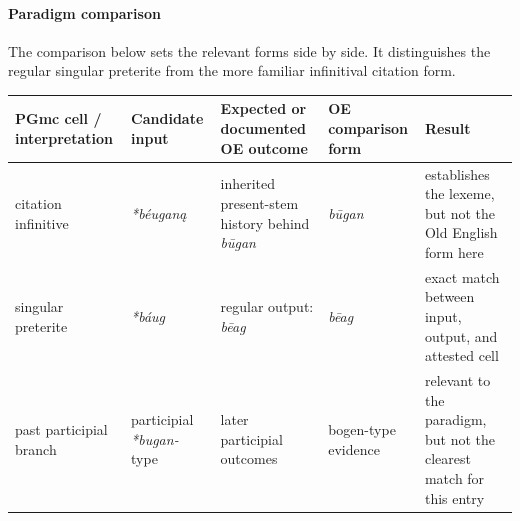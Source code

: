 \documentclass[
  british,
  a4paper,
]{article}
\newcounter{none} %
\begin{document}
\paragraph{Paradigm comparison}\label{paradigm-comparison-2}

The comparison below sets the relevant forms side by side. It
distinguishes the regular singular preterite from the more familiar
infinitival citation form.

{\def\LTcaptype{none} %
\begin{longtable}[]{@{}
  >{\raggedright\arraybackslash}p{}
  >{\raggedright\arraybackslash}p{}
  >{\raggedright\arraybackslash}p{}
  >{\raggedright\arraybackslash}p{}
  >{\raggedright\arraybackslash}p{}@{}}
\toprule\noalign{}
\begin{minipage}[b]{\linewidth}\raggedright
PGmc cell / interpretation
\end{minipage} & \begin{minipage}[b]{\linewidth}\raggedright
Candidate input
\end{minipage} & \begin{minipage}[b]{\linewidth}\raggedright
Expected or documented OE outcome
\end{minipage} & \begin{minipage}[b]{\linewidth}\raggedright
OE comparison form
\end{minipage} & \begin{minipage}[b]{\linewidth}\raggedright
Result
\end{minipage} \\
\midrule\noalign{}
\endhead
\bottomrule\noalign{}
\endlastfoot
citation infinitive & {\emph{*béuganą}} & inherited present-stem history
behind {\emph{būgan}} & {\emph{būgan}} & establishes the lexeme, but not
the Old English form here \\
singular preterite & {\emph{*báug}} & regular output: {\emph{bēag}} &
{\emph{bēag}} & exact match between input, output, and attested cell \\
past participial branch & participial \emph{*bugan-} type & later
participial outcomes & bogen-type evidence & relevant to the paradigm,
but not the clearest match for this entry \\
\end{longtable}
}
\end{document}
